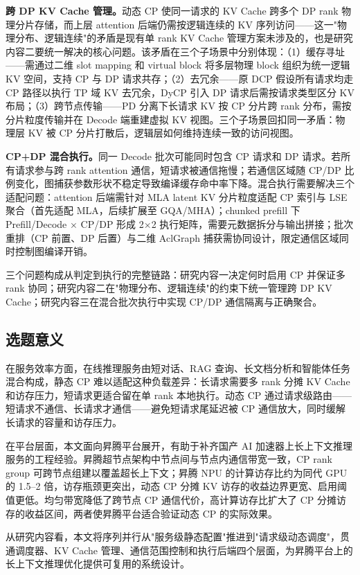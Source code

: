 \textbf{跨 DP KV Cache 管理。}动态 CP 使同一请求的 KV Cache 跨多个 DP rank 物理分片存储，而上层 attention 后端仍需按逻辑连续的 KV 序列访问——这一"物理分布、逻辑连续"的矛盾是现有单 rank KV Cache 管理方案未涉及的，也是研究内容二要统一解决的核心问题。该矛盾在三个子场景中分别体现：（1）缓存寻址——需通过二维 slot mapping 和 virtual block 将多层物理 block 组织为统一逻辑 KV 空间，支持 CP 与 DP 请求共存；（2）去冗余——原 DCP 假设所有请求均走 CP 路径以执行 TP 域 KV 去冗余，DyCP 引入 DP 请求后需按请求类型区分 KV 布局；（3）跨节点传输——PD 分离下长请求 KV 按 CP 分片跨 rank 分布，需按分片粒度传输并在 Decode 端重建虚拟 KV 视图。三个子场景回扣同一矛盾：物理层 KV 被 CP 分片打散后，逻辑层如何维持连续一致的访问视图。

\textbf{CP+DP 混合执行。}同一 Decode 批次可能同时包含 CP 请求和 DP 请求。若所有请求参与跨 rank attention 通信，短请求被通信拖慢；若通信区域随 CP/DP 比例变化，图捕获参数形状不稳定导致编译缓存命中率下降。混合执行需要解决三个适配问题：attention 后端需针对 MLA latent KV 分片粒度适配 CP 索引与 LSE 聚合（首先适配 MLA，后续扩展至 GQA/MHA）；chunked prefill 下 Prefill/Decode $\times$ CP/DP 形成 2$\times$2 执行矩阵，需要元数据拆分与输出拼接；批次重排（CP 前置、DP 后置）与二维 AclGraph 捕获需协同设计，限定通信区域同时控制图编译开销。

三个问题构成从判定到执行的完整链路：研究内容一决定何时启用 CP 并保证多 rank 协同；研究内容二在"物理分布、逻辑连续"的约束下统一管理跨 DP KV Cache；研究内容三在混合批次执行中实现 CP/DP 通信隔离与正确聚合。

\subsection{选题意义}

在服务效率方面，在线推理服务由短对话、RAG 查询、长文档分析和智能体任务混合构成，静态 CP 难以适配这种负载差异：长请求需要多 rank 分摊 KV Cache 和访存压力，短请求更适合留在单 rank 本地执行。动态 CP 通过请求级路由——短请求不通信、长请求才通信——避免短请求尾延迟被 CP 通信放大，同时缓解长请求的容量和访存压力。

在平台层面，本文面向昇腾平台展开，有助于补齐国产 AI 加速器上长上下文推理服务的工程经验。昇腾超节点架构中节点间与节点内通信带宽一致，CP rank group 可跨节点组建以覆盖超长上下文；昇腾 NPU 的计算访存比约为同代 GPU 的 1.5--2 倍，访存瓶颈更突出，动态 CP 分摊 KV 访存的收益边界更宽、启用阈值更低。均匀带宽降低了跨节点 CP 通信代价，高计算访存比扩大了 CP 分摊访存的收益区间，两者使昇腾平台适合验证动态 CP 的实际效果。

从研究内容看，本文将序列并行从"服务级静态配置"推进到"请求级动态调度"，贯通调度器、KV Cache 管理、通信范围控制和执行后端四个层面，为昇腾平台上的长上下文推理优化提供可复用的系统设计。

